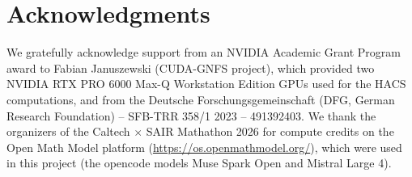 
\section*{Acknowledgments}
We gratefully acknowledge support from an NVIDIA Academic Grant Program award to Fabian Januszewski (CUDA-GNFS project), which provided two NVIDIA RTX PRO 6000 Max-Q Workstation Edition GPUs used for the HACS computations, and from the Deutsche Forschungsgemeinschaft (DFG, German Research Foundation) -- SFB-TRR 358/1 2023 -- 491392403.
We thank the organizers of the Caltech $\times$ SAIR Mathathon 2026 for compute credits on the Open Math Model platform (\url{https://os.openmathmodel.org/}), which were used in this project (the opencode models Muse Spark Open and Mistral Large 4).
